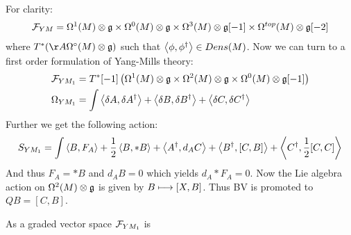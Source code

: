 \begin{example}
  For clarity:
  \begin{align}
    {\mathcal{F}}_{YM} = \Omega^1(M) \otimes \mathfrak{g} \times \Omega^0(M) \otimes \mathfrak{g} \times \Omega^3(M) \otimes \mathfrak{g}[-1] \times \Omega^{top}(M) \otimes \mathfrak{g}[-2]
  \end{align}
  where $T^*(\AA \Omega^\circ (M) \otimes \gf)$ such that $\pair{\phi}{\phi^\dagger} \in Dens(M)$. Now we can turn to a first order formulation of Yang-Mills theory:
  \begin{align}
    {\mathcal{F}}_{YM_1} &= T^*[-1]\left( \Omega^1(M) \otimes \mathfrak{g} \times \Omega^2(M) \otimes \mathfrak{g} \times \Omega^0(M) \otimes \mathfrak{g}[-1] \right) \\
    \Omega_{YM_1} &= \int \left\langle \delta A , \delta A^\dagger \right\rangle + \left\langle \delta B , \delta B^\dagger \right\rangle + \left\langle \delta C , \delta C^\dagger \right\rangle
  \end{align}
  Further we get the following action:
  \begin{equation}
    S_{YM_1} = \int \left\langle B , F_A \right\rangle + \frac{1}{2} \left\langle B , *B \right\rangle + \left\langle A^\dagger , d_A C \right\rangle + \left\langle B^\dagger , [C,B] \right\rangle + \left\langle C^\dagger , \frac{1}{2}[C,C] \right\rangle
  \end{equation}
  And thus $F_A = *B$ and $d_A B = 0$ which yields $d_A *F_A = 0$. Now the Lie algebra action on $\Omega^2 (M) \otimes \mathfrak{g}$ is given by $B \longmapsto [X,B]$. Thus BV is promoted to $QB = [C,B]$.

  \begin{rem}
    As a graded vector space ${\mathcal{F}}_{YM_1}$ is
  \end{rem}
\end{example}


